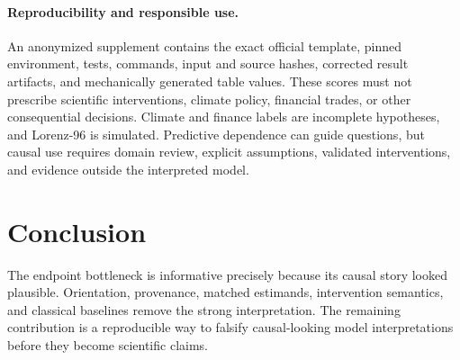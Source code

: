 \documentclass{article}
\begin{document}
\paragraph{Reproducibility and responsible use.}
An anonymized supplement contains the exact official template, pinned
environment, tests, commands, input and source hashes, corrected result
artifacts, and mechanically generated table values. These scores must not
prescribe scientific interventions, climate policy, financial trades, or
other consequential decisions. Climate and finance labels are incomplete
hypotheses, and Lorenz-96 is simulated. Predictive dependence can guide
questions, but causal use requires domain review, explicit assumptions,
validated interventions, and evidence outside the interpreted model.

\section{Conclusion}

The endpoint bottleneck is informative precisely because its causal story
looked plausible. Orientation, provenance, matched estimands, intervention
semantics, and classical baselines remove the strong interpretation. The
remaining contribution is a reproducible way to falsify causal-looking model
interpretations before they become scientific claims.

\label{lastmainpage}
\clearpage


\end{document}
